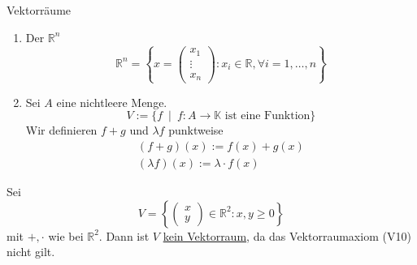 \begin{example}
    Vektorräume
    \begin{enumerate}
        \item Der $\mathbb{R}^n$
        \[
            \mathbb{R}^n=
            \left\{
            x =
            \begin{pmatrix}
                x_1 \\ \vdots \\ x_n
            \end{pmatrix} :
            x_i\in\mathbb{R}, \forall i = 1, \dots, n
            \right\}
        \]
        \item Sei $A$ eine nichtleere Menge.
        \[
            V := \{ f\ \mid\ f: A\to\mathbb{K} \text{ ist eine Funktion}\}
        \]
        Wir definieren $f+g$ und $\lambda f$ punktweise
        \begin{gather*}
            (f + g) (x) := f(x) + g(x)\\
            (\lambda f)(x) := \lambda \cdot f(x)
        \end{gather*}
    \end{enumerate}
\end{example}
\begin{example}
    Sei
    \[
        V = \left\{ \begin{pmatrix}
            x\\y
        \end{pmatrix} \in \mathbb{R}^2 : x,y\geq 0 \right\}    
    \]
    mit $+,\cdot$ wie bei $\mathbb{R}^2$. Dann ist $V$ \underline{kein Vektorraum}, da
    das Vektorraumaxiom (V10) nicht gilt.
\end{example}
